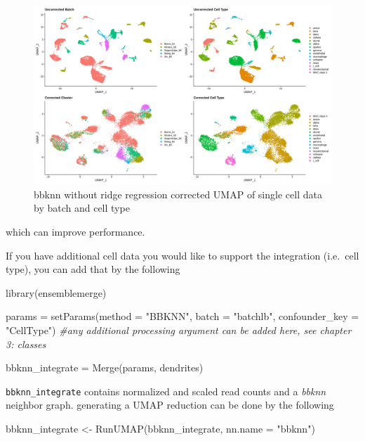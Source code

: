 \documentclass[
]{book}
\newenvironment{Shaded}{\begin{snugshade}}{\end{snugshade}}
\newcommand{\AttributeTok}[1]{\textcolor[rgb]{0.77,0.63,0.00}{#1}}
\newcommand{\CommentTok}[1]{\textcolor[rgb]{0.56,0.35,0.01}{\textit{#1}}}
\newcommand{\FunctionTok}[1]{\textcolor[rgb]{0.00,0.00,0.00}{#1}}
\newcommand{\NormalTok}[1]{#1}
\newcommand{\OtherTok}[1]{\textcolor[rgb]{0.56,0.35,0.01}{#1}}
\newcommand{\StringTok}[1]{\textcolor[rgb]{0.31,0.60,0.02}{#1}}
\begin{document}
\begin{figure}

{\centering \includegraphics[width=33.33in,height=0.8\textheight]{_book/ensemblemerge_files/images/bbknn_ridge_regress_false} 

}

\caption{bbknn without ridge regression corrected UMAP of single cell data by batch and cell type}\label{fig:unnamed-chunk-22}
\end{figure}

which can improve performance.

If you have additional cell data you would like to support the integration (i.e.~cell type), you can add that by the following

\begin{Shaded}
\begin{Highlighting}[]
\FunctionTok{library}\NormalTok{(ensemblemerge)}

\NormalTok{params }\OtherTok{=} \FunctionTok{setParams}\NormalTok{(}\AttributeTok{method =} \StringTok{"BBKNN"}\NormalTok{, }\AttributeTok{batch =} \StringTok{"batchlb"}\NormalTok{, }\AttributeTok{confounder\_key =} \StringTok{"CellType"}\NormalTok{) }\CommentTok{\#any additional processing argument can be added here, see chapter 3: classes}

\NormalTok{bbknn\_integrate }\OtherTok{=} \FunctionTok{Merge}\NormalTok{(params, dendrites)}
\end{Highlighting}
\end{Shaded}

\texttt{bbknn\_integrate} contains normalized and scaled read counts and a \emph{bbknn} neighbor graph. generating a UMAP reduction can be done by the following

\begin{Shaded}
\begin{Highlighting}[]
\NormalTok{bbknn\_integrate }\OtherTok{\textless{}{-}} \FunctionTok{RunUMAP}\NormalTok{(bbknn\_integrate, }\AttributeTok{nn.name =} \StringTok{"bbknn"}\NormalTok{)}
\end{Highlighting}
\end{Shaded}
\end{document}
